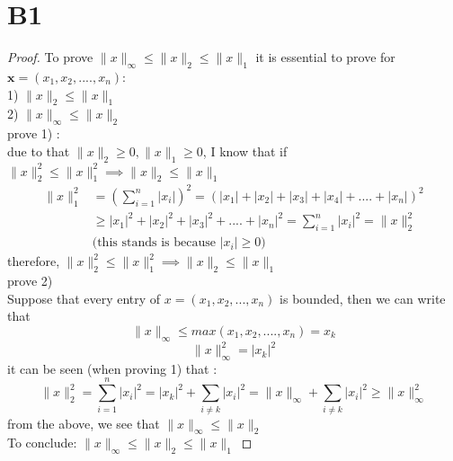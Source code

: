 \documentclass[12pt]{article}
\begin{document}
\newpage
\section*{B1}
\begin{proof}
        To prove $\|x\|_{\infty} \leq \|x\|_{2} \leq \|x\|_1$
        it is essential to prove for $\mathbf{x} = (x_1,x_2,....,x_n)$:\\
        1) $\|x\|_{2} \leq \|x\|_1$\\
        2)  $\|x\|_{\infty} \leq \|x\|_{2} $\\

\noindent        prove 1) :\\
due to that $\|x\|_2 \geq 0, \|x\|_1 \geq 0$, I know that if 
$\|x\|_2^2 \leq \|x\|_1^2 \implies \|x\|_2 \leq \|x\|_1 $
\[
        \begin{aligned}
                \|x\|_1^2 & = (\sum_{i=1}^{n}|x_i|)^2 = (|x_1|+|x_2|+|x_3|+|x_4|+....+|x_n|)^2 \\
                          & \geq |x_1|^2 +|x_2|^2 + |x_3|^2+....+|x_n|^2 = \sum_{i=1}^{n} |x_i|^2 = \|x\|_2^2 \\
                          & \text{(this stands is because $|x_i|\geq 0)$          }
        \end{aligned}
        \]
therefore, $\|x\|_2^2 \leq \|x\|_1^2 \implies \|x\|_2 \leq \|x\|_1  $ \\

\noindent prove 2) \\
Suppose that every entry of $x=(x_1,x_2,...,x_n)$ is bounded, then we can write that $$\|x\|_{\infty} \leq max(x_1,x_2,....,x_n) = x_k$$ $$\|x\|_{\infty}^2 = |x_k|^2$$    
it can be seen (when proving 1) that : $$\|x\|_{2}^2 =  \sum_{i=1}^{n} |x_i|^2  = |x_k|^2 + \sum_{i \neq k} |x_i|^2 = \|x\|_{\infty} + \sum_{i \neq k} |x_i|^2 \geq \|x\|_{\infty}^2 $$
from the above, we see that $\|x\|_{\infty} \leq   \|x\|_{2}$\\

\noindent To conclude: 
$\|x\|_{\infty} \leq \|x\|_{2} \leq \|x\|_1$
\end{proof}

\newpage
\end{document}
